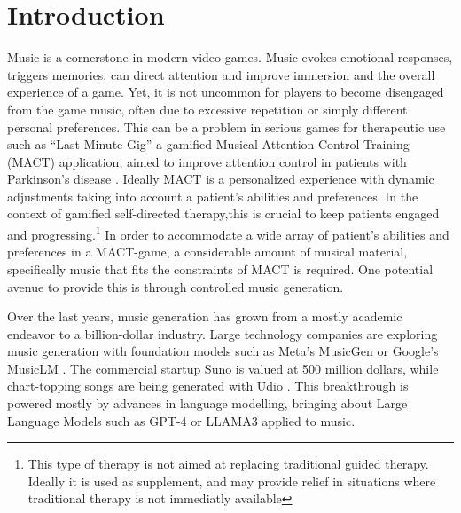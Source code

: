

\chapter{Introduction}
\label{chap:intro}
\pagestyle{fancy}

Music is a cornerstone in modern video games. Music evokes emotional responses, triggers memories, can direct attention and improve immersion and the overall experience of a game. Yet, it is not uncommon for players to become disengaged from the game music, often due to excessive repetition or simply different personal preferences.\cite{Rogers_Weber_2019} This can be a problem in serious games for therapeutic use such as “Last Minute Gig” a gamified Musical Attention Control Training (MACT) application, aimed to improve attention control in patients with Parkinson’s disease \cite{Chalkiadakis_2022}. Ideally MACT is a personalized experience with dynamic adjustments taking into account a patient's abilities and preferences. In the context of gamified self-directed therapy,this is crucial to keep patients engaged and progressing.\footnote{This type of therapy is not aimed at replacing traditional guided therapy. Ideally it is used as supplement, and may provide relief in situations where traditional therapy is not immediatly available} In order to accommodate a wide array of patient's abilities and preferences in a MACT-game, a considerable amount of musical material, specifically music that fits the constraints of MACT is required. One potential avenue to provide this is through controlled music generation.

Over the last years, music generation has grown from a mostly academic endeavor to a billion-dollar industry. Large technology companies are exploring music generation with foundation models such as Meta’s MusicGen\cite{copet2023simple} or Google’s MusicLM 
\cite{Agostinelli_Denk_Borsos_Engel_Verzetti_Caillon_Huang_Jansen_Roberts_Tagliasacchi_et_al._2023}. The commercial startup Suno is valued at 500 million dollars, while chart-topping songs are being generated with Udio \cite{Ferdinand_Meyen_2024}\cite{Stassen_2024}. This breakthrough is powered mostly by advances in language modelling, bringing about Large Language Models such as GPT-4 or LLAMA3 applied to music.

